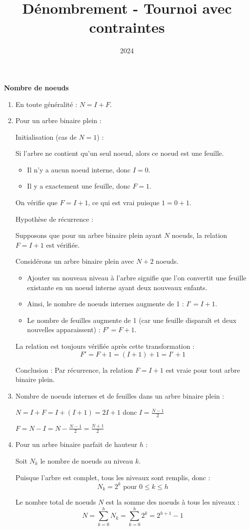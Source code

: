 \documentclass[10pt,a4paper]{article}
\title{Dénombrement - Tournoi avec contraintes}
\author{}
\date{2024}
\begin{document}
\q \textbf{Nombre de noeuds}

\begin{enumerate}
    \item En toute généralité : \( N = I + F \).

    \item Pour un arbre binaire plein :

    Initialisation (cas de \( N = 1 \)) :

    Si l'arbre ne contient qu'un seul noeud, alors ce noeud
    est une feuille.
    \begin{itemize}
        \item Il n'y a aucun noeud interne, donc \( I = 0 \).
        \item Il y a exactement une feuille, donc \( F = 1 \).
    \end{itemize}
    On vérifie que \( F = I + 1 \), ce qui est vrai puisque \( 1 = 0 + 1 \).

    Hypothèse de récurrence :

    Supposons que pour un arbre binaire plein ayant \( N \) noeuds, la relation \( F = I + 1 \) est
    vérifiée.

    Considérons un arbre binaire plein avec \( N+2 \) noeuds.
    \begin{itemize}
        \item Ajouter un nouveau niveau à l'arbre signifie que l'on convertit une feuille existante
        en un noeud interne ayant deux nouveaux enfants.
        \item Ainsi, le nombre de noeuds internes augmente de 1 : \( I' = I + 1 \).
        \item Le nombre de feuilles augmente de 1 (car une feuille disparaît et deux nouvelles
        apparaissent) : \( F' = F + 1 \).
    \end{itemize}
    La relation est toujours vérifiée après cette transformation :
    \[
    F' = F + 1 = (I + 1) + 1 = I' + 1
    \]

    Conclusion : Par récurrence, la relation \( F = I + 1 \) est vraie pour tout arbre binaire
    plein.

    \item Nombre de noeuds internes et de feuilles dans un arbre binaire plein :

    $ N = I + F = I + (I + 1) = 2I + 1 $ donc $ I = \frac{N - 1}{2} $

    $ F = N - I = N - \frac{N - 1}{2} = \frac{N + 1}{2} $

    \item Pour un arbre binaire parfait de hauteur \(h\) :

    Soit \(N_k\) le nombre de noeuds au niveau \(k\).

    Puisque l'arbre est complet, tous les niveaux sont remplis, donc :
    \[ N_k = 2^k \text{ pour } 0 \leq k \leq h \]

    Le nombre total de noeuds \(N\) est la somme des noeuds à tous les niveaux :
    \[ N = \sum_{k=0}^h N_k = \sum_{k=0}^h 2^k = 2^{h+1} - 1 \]

\end{enumerate}
\end{document}
